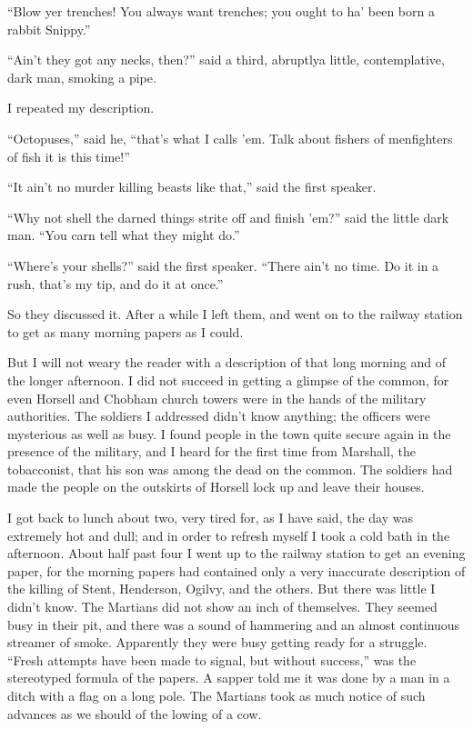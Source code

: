 ``Blow yer trenches! You always want trenches; you ought to ha' been
born a rabbit Snippy.''

``Ain't they got any necks, then?'' said a third, abruptly\dash{}a little,
contemplative, dark man, smoking a pipe.

I repeated my description.

``Octopuses,'' said he, ``that's what I calls 'em. Talk about fishers
of men\dash{}fighters of fish it is this time!''

``It ain't no murder killing beasts like that,'' said the first
speaker.

``Why not shell the darned things strite off and finish 'em?'' said
the little dark man. ``You carn tell what they might do.''

``Where's your shells?'' said the first speaker. ``There ain't no
time. Do it in a rush, that's my tip, and do it at once.''

So they discussed it. After a while I left them, and went on to the
railway station to get as many morning papers as I could.

But I will not weary the reader with a description of that long
morning and of the longer afternoon. I did not succeed in getting a
glimpse of the common, for even Horsell and Chobham church towers
were in the hands of the military authorities. The soldiers I
addressed didn't know anything; the officers were mysterious as
well as busy. I found people in the town quite secure again in the
presence of the military, and I heard for the first time from
Marshall, the tobacconist, that his son was among the dead on the
common. The soldiers had made the people on the outskirts of
Horsell lock up and leave their houses.

I got back to lunch about two, very tired for, as I have said, the
day was extremely hot and dull; and in order to refresh myself I
took a cold bath in the afternoon. About half past four I went up
to the railway station to get an evening paper, for the morning
papers had contained only a very inaccurate description of the
killing of Stent, Henderson, Ogilvy, and the others. But there was
little I didn't know. The Martians did not show an inch of
themselves. They seemed busy in their pit, and there was a sound of
hammering and an almost continuous streamer of smoke. Apparently
they were busy getting ready for a struggle. ``Fresh attempts have
been made to signal, but without success,'' was the stereotyped
formula of the papers. A sapper told me it was done by a man in a
ditch with a flag on a long pole. The Martians took as much notice
of such advances as we should of the lowing of a cow.

